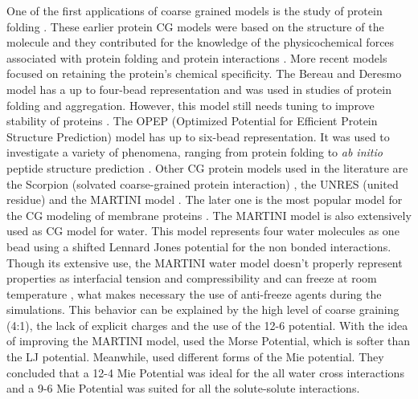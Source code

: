 One of the first applications of coarse grained models is the study of protein folding \cite{levitt1975,levitt1976}. These earlier protein CG models were based on the structure of the molecule and they contributed for the knowledge of the physicochemical forces associated with protein folding and protein interactions \cite{koga2001}.  More recent models focused on retaining the protein's chemical specificity. The Bereau and Deresmo model \cite{bereau2009} has a up to four-bead representation and was used in studies of protein folding and aggregation. However, this model still needs tuning to improve stability of proteins \cite{bereau2010}. The OPEP (Optimized Potential for Efficient Protein Structure Prediction) model \cite{opep2014,opep2015} has up to six-bead representation. It was used to investigate a variety of phenomena, ranging from protein folding to \textit{ab initio} peptide structure prediction \cite{opep2011,opep2009,opep20092}. Other CG protein models used in the literature are the Scorpion (solvated coarse-grained protein interaction)  \cite{scorpion2013}, the UNRES (united residue) \cite{unres2014} and the MARTINI model \cite{martini2013}. The later one is the most popular model for the CG modeling of membrane proteins \cite{martini20132}. The MARTINI model is also extensively used as CG model for water. This model represents four water molecules as one bead using a shifted Lennard Jones potential for the non bonded interactions. Though its extensive use, the MARTINI water model doesn't properly represent properties as interfacial tension and compressibility \cite{shinoda2010} and can freeze at room temperature \cite{winger2009,martini2007}, what makes necessary the use of anti-freeze agents during the simulations. This behavior can be explained by the high level of coarse graining (4:1), the lack of explicit charges and the use of the 12-6 potential. With the idea of improving the MARTINI model,  used the Morse Potential, which is softer than the LJ potential. Meanwhile,  used different forms of the Mie potential. They concluded that a 12-4 Mie Potential was ideal for the all water cross interactions and  a 9-6 Mie Potential was suited for all the solute-solute interactions. 

